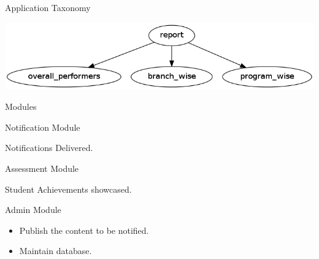 \documentclass[14pt]{beamer}
\begin{document}
\begin{frame}{Application Taxonomy}

	\begin{center}

	\includegraphics[scale = 0.4]{report.png}

	\end{center}

\end{frame}

\begin{frame}{Modules}

	\begin{block}{Notification Module}

		Notifications Delivered.

	\end{block}

	\begin{block}{Assessment Module}

		Student Achievements showcased.

	\end{block}

	\begin{block}{Admin Module}

		\begin{itemize}

		\item Publish the content to be notified.

		\item Maintain database.

		\end{itemize}

	\end{block}

\end{frame}
\end{document}
